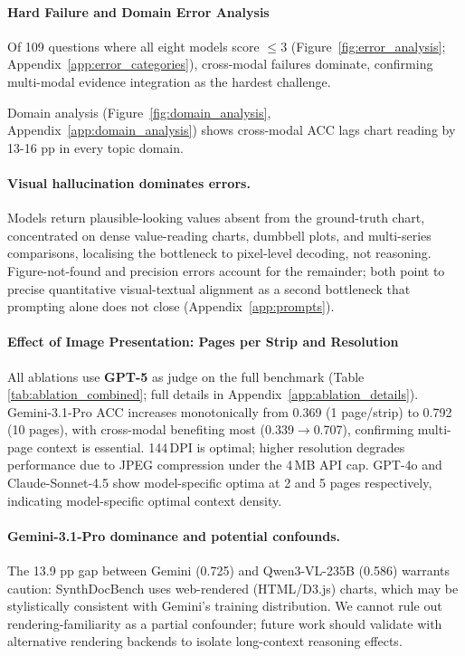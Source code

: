 \paragraph{Hard Failure and Domain Error Analysis}
\label{sec:error_analysis}
Of 109 questions where all eight models score $\leq 3$ (Figure~\ref{fig:error_analysis}; Appendix~\ref{app:error_categories}), cross-modal failures dominate, confirming multi-modal evidence integration as the hardest challenge. 

Domain analysis (Figure~\ref{fig:domain_analysis}, Appendix~\ref{app:domain_analysis}) shows cross-modal ACC lags chart reading by 13-16 pp in every topic domain.

\paragraph{Visual hallucination dominates errors.}
Models return plausible-looking values absent from the ground-truth chart, concentrated on dense value-reading charts, dumbbell plots, and multi-series comparisons, localising the bottleneck to pixel-level decoding, not reasoning. Figure-not-found and precision errors account for the remainder; both point to precise quantitative visual-textual alignment as a second bottleneck that prompting alone does not close (Appendix~\ref{app:prompts}).

\paragraph{Effect of Image Presentation: Pages per Strip and Resolution}
\label{sec:ablation_rendering}

All ablations use \textbf{GPT-5} as judge on the full benchmark (Table \ref{tab:ablation_combined}; full details in Appendix~\ref{app:ablation_details}). Gemini-3.1-Pro ACC increases monotonically from 0.369 (1 page/strip) to 0.792 (10 pages), with cross-modal benefiting most (0.339$\to$0.707), confirming multi-page context is essential. 144\,DPI is optimal; higher resolution degrades performance due to JPEG compression under the 4\,MB API cap. GPT-4o and Claude-Sonnet-4.5 show model-specific optima at 2 and 5 pages respectively, indicating model-specific optimal context density.

\paragraph{Gemini-3.1-Pro dominance and potential confounds.}
The 13.9 pp gap between Gemini (0.725) and Qwen3-VL-235B (0.586) warrants caution: SynthDocBench uses web-rendered (HTML/D3.js) charts, which may be stylistically consistent with Gemini's training distribution. We cannot rule out rendering-familiarity as a partial confounder; future work should validate with alternative rendering backends to isolate long-context reasoning effects.


